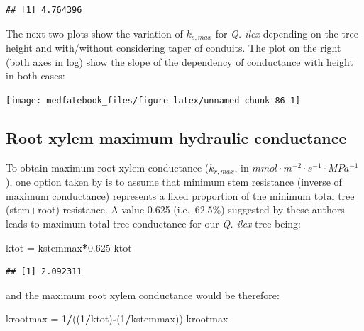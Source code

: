 \documentclass[]{book}
\newenvironment{Shaded}{\begin{snugshade}}{\end{snugshade}}
\newcommand{\DecValTok}[1]{\textcolor[rgb]{0.00,0.00,0.81}{#1}}
\newcommand{\FloatTok}[1]{\textcolor[rgb]{0.00,0.00,0.81}{#1}}
\newcommand{\StringTok}[1]{\textcolor[rgb]{0.31,0.60,0.02}{#1}}
\newcommand{\OperatorTok}[1]{\textcolor[rgb]{0.81,0.36,0.00}{\textbf{#1}}}
\newcommand{\NormalTok}[1]{#1}
\begin{document}
\begin{verbatim}
## [1] 4.764396
\end{verbatim}

The next two plots show the variation of \(k_{s,max}\) for \emph{Q.
ilex} depending on the tree height and with/without considering taper of
conduits. The plot on the right (both axes in log) show the slope of the
dependency of conductance with height in both cases:

\begin{center}\texttt{[image: medfatebook\_files/figure-latex/unnamed-chunk-86-1]} \end{center}

\subsection{Root xylem maximum hydraulic
conductance}\label{root-xylem-maximum-hydraulic-conductance}

To obtain maximum root xylem conductance (\(k_{r, max}\), in
\(mmol \cdot m^{-2} \cdot s^{-1} \cdot MPa^{-1}\)), one option taken by
\citet{Christoffersen2016} is to assume that minimum stem resistance
(inverse of maximum conductance) represents a fixed proportion of the
minimum total tree (stem+root) resistance. A value 0.625 (i.e.~62.5\%)
suggested by these authors leads to maximum total tree conductance for
our \emph{Q. ilex} tree being:

\begin{Shaded}
\begin{Highlighting}[]
\NormalTok{ktot =}\StringTok{ }\NormalTok{kstemmax}\OperatorTok{*}\FloatTok{0.625}
\NormalTok{ktot}
\end{Highlighting}
\end{Shaded}

\begin{verbatim}
## [1] 2.092311
\end{verbatim}

and the maximum root xylem conductance would be therefore:

\begin{Shaded}
\begin{Highlighting}[]
\NormalTok{krootmax =}\StringTok{ }\DecValTok{1}\OperatorTok{/}\NormalTok{((}\DecValTok{1}\OperatorTok{/}\NormalTok{ktot)}\OperatorTok{-}\NormalTok{(}\DecValTok{1}\OperatorTok{/}\NormalTok{kstemmax))}
\NormalTok{krootmax}
\end{Highlighting}
\end{Shaded}
\end{document}

